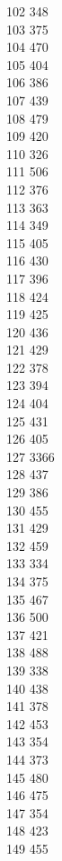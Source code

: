 { 102	348 \\
 103	375 \\
 104	470 \\
 105	404 \\
 106	386 \\
 107	439 \\
 108	479 \\
 109	420 \\
 110	326 \\
 111	506 \\
 112	376 \\
 113	363 \\
 114	349 \\
 115	405 \\
 116	430 \\
 117	396 \\
 118	424 \\
 119	425 \\
 120	436 \\
 121	429 \\
 122	378 \\
 123	394 \\
 124	404 \\
 125	431 \\
 126	405 \\
 127	3366 \\
 128	437 \\
 129	386 \\
 130	455 \\
 131	429 \\
 132	459 \\
 133	334 \\
 134	375 \\
 135	467 \\
 136	500 \\
 137	421 \\
 138	488 \\
 139	338 \\
 140	438 \\
 141	378 \\
 142	453 \\
 143	354 \\
 144	373 \\
 145	480 \\
 146	475 \\
 147	354 \\
 148	423 \\
 149	455 \\
}

